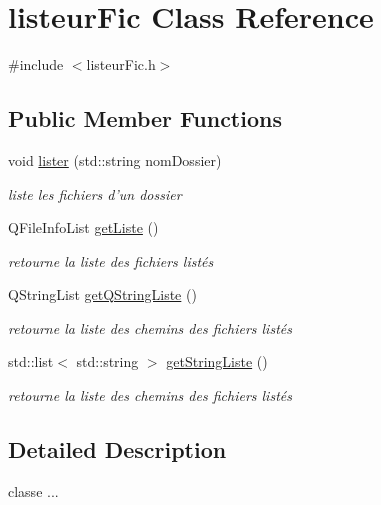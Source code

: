 \hypertarget{classlisteur_fic}{\section{listeur\-Fic Class Reference}
\label{classlisteur_fic}
}


{\ttfamily \#include $<$listeur\-Fic.\-h$>$}

\subsection*{Public Member Functions}
\begin{DoxyCompactItemize}
\item 
void \hyperlink{classlisteur_fic_a9a035fde2cef3b9d70fbabfd98923493}{lister} (std\-::string nom\-Dossier)
\begin{DoxyCompactList}\small\item\em liste les fichiers d'un dossier \end{DoxyCompactList}\item 
Q\-File\-Info\-List \hyperlink{classlisteur_fic_a319d2a5d9de00dc984907b9256a7552b}{get\-Liste} ()
\begin{DoxyCompactList}\small\item\em retourne la liste des fichiers listés \end{DoxyCompactList}\item 
Q\-String\-List \hyperlink{classlisteur_fic_a769367aff699655d7e42450ac2f4a339}{get\-Q\-String\-Liste} ()
\begin{DoxyCompactList}\small\item\em retourne la liste des chemins des fichiers listés \end{DoxyCompactList}\item 
std\-::list$<$ std\-::string $>$ \hyperlink{classlisteur_fic_a859f53b053cd6f0d38bb36e6ae462b62}{get\-String\-Liste} ()
\begin{DoxyCompactList}\small\item\em retourne la liste des chemins des fichiers listés \end{DoxyCompactList}\end{DoxyCompactItemize}


\subsection{Detailed Description}
classe ... 

